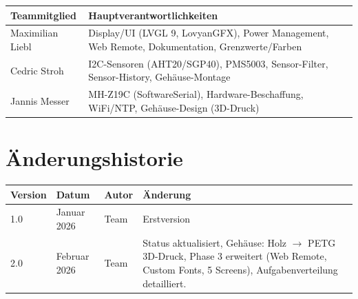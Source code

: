 \documentclass[a4paper,11pt]{article}
\begin{document}
\begin{tabularx}{\textwidth}{lX}
\toprule
\rowcolor{tableheader}
\textbf{Teammitglied} & \textbf{Hauptverantwortlichkeiten} \\
\midrule
Maximilian Liebl & Display/UI (LVGL 9, LovyanGFX), Power Management, Web Remote, Dokumentation, Grenzwerte/Farben \\
Cedric Stroh & I2C-Sensoren (AHT20/SGP40), PMS5003, Sensor-Filter, Sensor-History, Gehäuse-Montage \\
Jannis Messer & MH-Z19C (SoftwareSerial), Hardware-Beschaffung, WiFi/NTP, Gehäuse-Design (3D-Druck) \\
\bottomrule
\end{tabularx}

\section{Änderungshistorie}

\begin{tabularx}{\textwidth}{l l l X}
\toprule
\rowcolor{tableheader}
\textbf{Version} & \textbf{Datum} & \textbf{Autor} & \textbf{Änderung} \\
\midrule
1.0 & Januar 2026 & Team & Erstversion \\
2.0 & Februar 2026 & Team & Status aktualisiert, Gehäuse: Holz $\to$ PETG 3D-Druck, Phase 3 erweitert (Web Remote, Custom Fonts, 5 Screens), Aufgabenverteilung detailliert. \\
\bottomrule
\end{tabularx}
\end{document}
